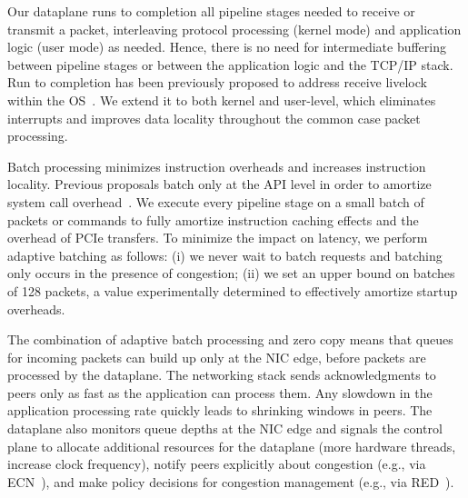 

 Our dataplane
runs to completion all pipeline stages needed to receive or transmit a
packet, interleaving protocol processing (kernel mode) and application
logic (user mode) as needed. Hence, there is no need for intermediate
buffering between pipeline stages or between the application logic and
the TCP/IP stack. Run to completion has been previously proposed to
address receive livelock within the OS~\cite{receivelivelock}. We
extend it to both kernel and user-level, which eliminates interrupts
and improves data locality throughout the common case packet
processing.

Batch processing minimizes instruction overheads and increases
instruction locality. Previous proposals batch only at the API level
in order to amortize system call
overhead~\cite{jeong2014mtcp,han2012megapipe,soares2010flexsc}. We
execute every pipeline stage on a small batch of packets or commands
to fully amortize instruction caching effects and the overhead of PCIe
transfers. To minimize the impact on latency, we perform adaptive
batching as follows: (i) we never wait to batch requests and batching
only occurs in the presence of congestion; (ii) we set an upper bound
on batches of 128 packets, a value experimentally determined to
effectively amortize startup overheads.


The combination of adaptive batch processing and zero copy means that
queues for incoming packets can build up only at the NIC edge, before
packets are processed by the dataplane.  The networking stack sends
acknowledgments to peers only as fast as the application can process
them. Any slowdown in the application processing rate quickly leads to
shrinking windows in peers. The dataplane also monitors queue depths
at the NIC edge and signals the control plane to allocate additional
resources for the dataplane (more hardware threads, increase clock
frequency), notify peers explicitly about congestion (e.g., via
ECN~\cite{ramakrishnan2001addition}), and make policy decisions for
congestion management (e.g., via
RED~\cite{DBLP:journals/ton/FloydJ93}).

